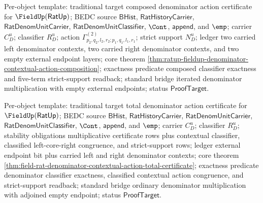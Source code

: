 Per-object template: traditional target composed denominator action
certificate for $\FieldUp(\mathsf{RatUp})$; BEDC source $\mathsf{BHist}$,
$\mathsf{RatHistoryCarrier}$, $\mathsf{RatDenomUnitCarrier}$,
$\mathsf{RatDenomUnitClassifier}$, $\Cont$, $\mathsf{append}$, and $\emp$;
carrier $C_D^u$; classifier $R_D^u$; action
$\Gamma^{(2)}_{p_2,q_2,l_2,r_2;p_1,q_1,l_1,r_1}$; strict support $N_D^u$;
ledger two carried left denominator contexts, two carried right denominator
contexts, and two empty external endpoint layers; core theorem
\autoref{thm:ratup-fieldup-denominator-contextual-action-composition};
exactness predicate composed classifier exactness and five-term strict-support
readback; standard bridge iterated denominator multiplication with empty
external endpoints; status $\mathsf{ProofTarget}$.

Per-object template: traditional target total denominator action certificate
for $\FieldUp(\mathsf{RatUp})$; BEDC source $\mathsf{BHist}$,
$\mathsf{RatHistoryCarrier}$, $\mathsf{RatDenomUnitCarrier}$,
$\mathsf{RatDenomUnitClassifier}$, $\Cont$, $\mathsf{append}$, and $\emp$;
carrier $C_D^u$; classifier $R_D^u$; stability obligations multiplicative
certificate rows plus contextual classifier, classified left-core-right
congruence, and strict-support rows; ledger external endpoint bit plus carried
left and right denominator contexts; core theorem
\autoref{thm:field-rat-denominator-contextual-action-total-certificate};
exactness predicate denominator classifier exactness, classified contextual
action congruence, and strict-support readback; standard bridge ordinary
denominator multiplication with adjoined empty endpoint; status
$\mathsf{ProofTarget}$.

